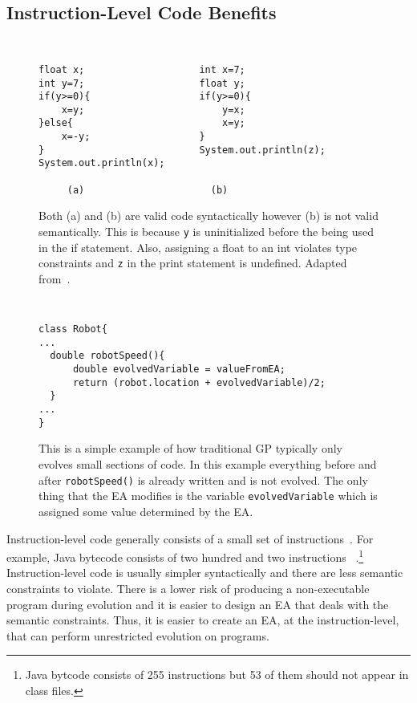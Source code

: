 \documentclass{sig-alternate}
\begin{document}
\subsection{Instruction-Level Code Benefits}
\begin{figure}
\centering
{\tt
\begin{verbatim}
float x;                    int x=7;
int y=7;                    float y;
if(y>=0){                   if(y>=0){
    x=y;                        y=x;
}else{                          x=y;
    x=-y;                   }
}                           System.out.println(z);
System.out.println(x);	
     
     (a)                      (b)

\end{verbatim}
}
\caption{Both (a) and (b) are valid code syntactically however (b) is not valid semantically. This is because \texttt{y} is uninitialized before the being used in the if statement. Also, assigning a float to an int violates type constraints and \texttt{z} in the print statement is undefined. Adapted from~\cite{FINCH:2011}.}
\label{semantics}
\end{figure}

\begin{figure}
\centering
{\tt
\begin{verbatim}
class Robot{	
...
  double robotSpeed(){	
      double evolvedVariable = valueFromEA;
      return (robot.location + evolvedVariable)/2;
  }
...
}

\end{verbatim}
}
\caption{This is a simple example of how traditional GP typically only evolves small sections of code. In this example everything before and after \texttt{robotSpeed()} is already written and is not evolved. The only thing that the EA modifies is the variable \texttt{evolvedVariable} which is assigned some value determined by the EA.}
\label{traditional}
\end{figure}


Instruction-level code generally consists of a small set of instructions~\cite{Assembly:2010}. For example, Java bytecode consists of two hundred and two instructions ~\cite{JVMspec:2013}.\footnote{Java bytcode consists of 255 instructions but 53 of them should not appear in class files.} Instruction-level code is usually simpler syntactically and there are less semantic constraints to violate. There is a lower risk of producing a non-executable program during evolution and it is easier to design an EA that deals with the semantic constraints. Thus, it is easier to create an EA, at the instruction-level, that can perform unrestricted evolution on programs.\par
\end{document}
